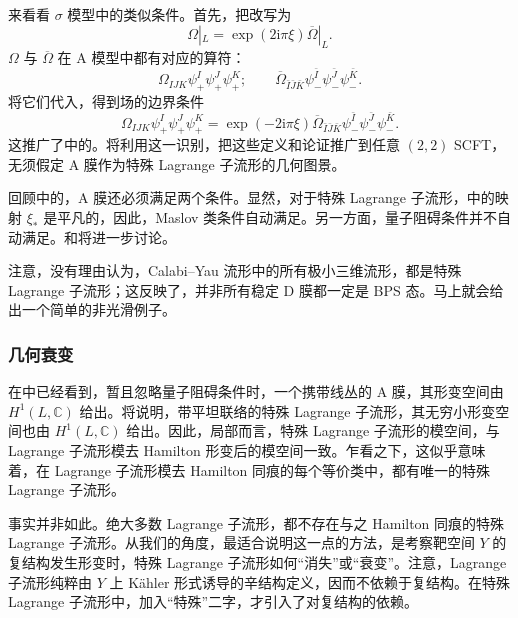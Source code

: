 来看看 $\sigma$ 模型中的类似条件。首先，把改写为
\begin{equation}\label{eq:5.19}
\Omega|_L=\exp(2\mathrm{i}\pi\xi)\overline\Omega|_L.
\end{equation}
$\Omega$ 与 $\overline\Omega$ 在 A 模型中都有对应的算符：
\[
\Omega_{IJK}\psi_+^I\psi_+^J\psi_+^K;\qquad
\overline\Omega_{\bar I\bar J\bar K}\psi_-^{\bar I}\psi_-^{\bar J}\psi_-^{\bar K}.
\]
将它们代入，得到场的边界条件
\begin{equation}\label{eq:5.20}
\Omega_{IJK}\psi_+^I\psi_+^J\psi_+^K
=\exp(-2\mathrm{i}\pi\xi)\overline\Omega_{\bar I\bar J\bar K}
\psi_-^{\bar I}\psi_-^{\bar J}\psi_-^{\bar K}.
\end{equation}
这推广了中的。将利用这一识别，把这些定义和论证推广到任意 $(2,2)$ SCFT，无须假定 A 膜作为特殊 Lagrange 子流形的几何图景。

回顾中的，A 膜还必须满足两个条件。显然，对于特殊 Lagrange 子流形，中的映射 $\xi_*$ 是平凡的，因此，Maslov 类条件自动满足。另一方面，量子阻碍条件并不自动满足。和将进一步讨论。

注意，没有理由认为，Calabi--Yau 流形中的所有极小三维流形，都是特殊 Lagrange 子流形；这反映了，并非所有稳定 D 膜都一定是 BPS 态。马上就会给出一个简单的非光滑例子。

\subsubsection{几何衰变}\label{sec:5.2.1.2}

在中已经看到，暂且忽略量子阻碍条件时，一个携带线丛的 A 膜，其形变空间由 $H^1(L,\mathbb{C})$ 给出。将说明，带平坦联络的特殊 Lagrange 子流形，其无穷小形变空间也由 $H^1(L,\mathbb{C})$ 给出。因此，局部而言，特殊 Lagrange 子流形的模空间，与 Lagrange 子流形模去 Hamilton 形变后的模空间一致。乍看之下，这似乎意味着，在 Lagrange 子流形模去 Hamilton 同痕的每个等价类中，都有唯一的特殊 Lagrange 子流形。

事实并非如此。绝大多数 Lagrange 子流形，都不存在与之 Hamilton 同痕的特殊 Lagrange 子流形。从我们的角度，最适合说明这一点的方法，是考察靶空间 $Y$ 的复结构发生形变时，特殊 Lagrange 子流形如何“消失”或“衰变”。注意，Lagrange 子流形纯粹由 $Y$ 上 K\"ahler 形式诱导的辛结构定义，因而不依赖于复结构。在特殊 Lagrange 子流形中，加入“特殊”二字，才引入了对复结构的依赖。


